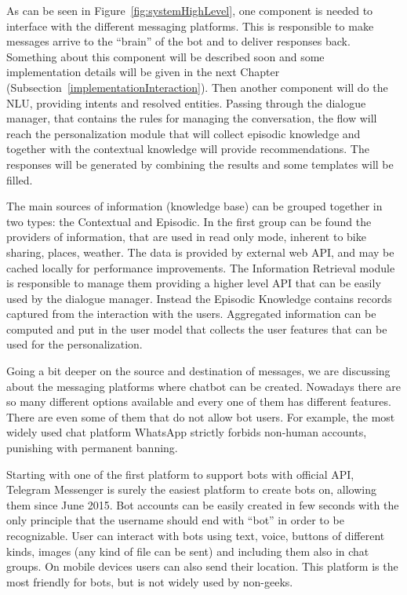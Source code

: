 As can be seen in Figure~\ref{fig:systemHighLevel}, one component is needed to interface with the different messaging platforms. This is responsible to make messages arrive to the ``brain'' of the bot and to deliver responses back. Something about this component will be described soon and some implementation details will be given in the next Chapter (Subsection~\ref{implementationInteraction}). Then another component will do the NLU, providing intents and resolved entities. Passing through the dialogue manager, that contains the rules for managing the conversation, the flow will reach the personalization module that will collect episodic knowledge and together with the contextual knowledge will provide recommendations. The responses will be generated by combining the results and some templates will be filled.

The main sources of information (knowledge base) can be grouped together in two types: the Contextual and Episodic. In the first group can be found the providers of information, that are used in read only mode, inherent to bike sharing, places, weather. The data is provided by external web API, and may be cached locally for performance improvements. The Information Retrieval module is responsible to manage them providing a higher level API that can be easily used by the dialogue manager. Instead the Episodic Knowledge contains records captured from the interaction with the users. Aggregated information can be computed and put in the user model that collects the user features that can be used for the personalization.

Going a bit deeper on the source and destination of messages, we are discussing about the messaging platforms where chatbot can be created. Nowadays there are so many different options available and every one of them has different features. There are even some of them that do not allow bot users. For example, the most widely used chat platform WhatsApp strictly forbids non-human accounts, punishing with permanent banning.

Starting with one of the first platform to support bots with official API, Telegram Messenger is surely the easiest platform to create bots on, allowing them since June 2015. Bot accounts can be easily created in few seconds with the only principle that the username should end with ``bot'' in order to be recognizable. User can interact with bots using text, voice, buttons of different kinds, images (any kind of file can be sent) and including them also in chat groups. On mobile devices users can also send their location. This platform is the most friendly for bots, but is not widely used by non-geeks.


